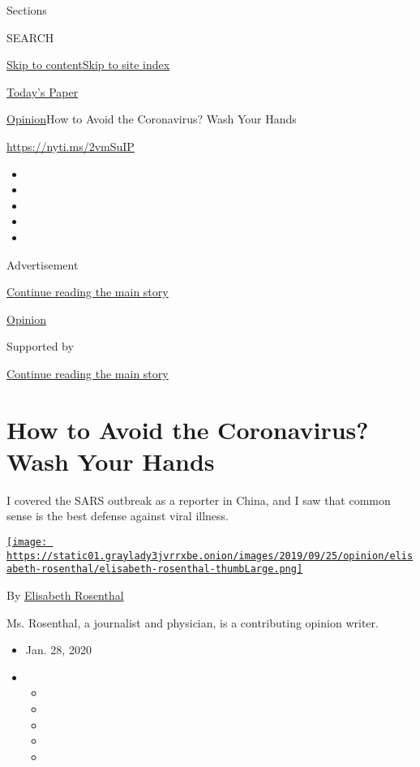 Sections

SEARCH

\protect\hyperlink{site-content}{Skip to
content}\protect\hyperlink{site-index}{Skip to site index}

\href{https://myaccount.nytimes3xbfgragh.onion/auth/login?response_type=cookie\&client_id=vi}{}

\href{https://www.nytimes3xbfgragh.onion/section/todayspaper}{Today's
Paper}

\href{/section/opinion}{Opinion}\textbar{}How to Avoid the Coronavirus?
Wash Your Hands

\url{https://nyti.ms/2vmSuIP}

\begin{itemize}
\item
\item
\item
\item
\item
\end{itemize}

Advertisement

\protect\hyperlink{after-top}{Continue reading the main story}

\href{/section/opinion}{Opinion}

Supported by

\protect\hyperlink{after-sponsor}{Continue reading the main story}

\hypertarget{how-to-avoid-the-coronavirus-wash-your-hands}{%
\section{How to Avoid the Coronavirus? Wash Your
Hands}\label{how-to-avoid-the-coronavirus-wash-your-hands}}

I covered the SARS outbreak as a reporter in China, and I saw that
common sense is the best defense against viral illness.

\href{https://www.nytimes3xbfgragh.onion/by/elisabeth-rosenthal}{\texttt{[image: https://static01.graylady3jvrrxbe.onion/images/2019/09/25/opinion/elisabeth-rosenthal/elisabeth-rosenthal-thumbLarge.png]}}

By
\href{https://www.nytimes3xbfgragh.onion/by/elisabeth-rosenthal}{Elisabeth
Rosenthal}

Ms. Rosenthal, a journalist and physician, is a contributing opinion
writer.

\begin{itemize}
\item
  Jan. 28, 2020
\item
  \begin{itemize}
  \item
  \item
  \item
  \item
  \item
  \end{itemize}
\end{itemize}

